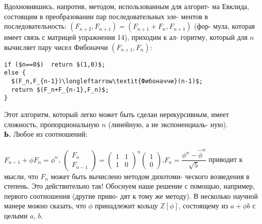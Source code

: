 Вдохновившись, напротив, методом, использованным для алгорит-\linebreak
ма Евклида, состоящим в преобразовании пар последовательных эле-\linebreak
ментов в последовательность: $(F_{n+2},F_{n+1})=(F_{n+1}+F_n,F_{n+1})$ (фор-\linebreak
мула, которая имеет связь с матрицей упражнения 14), приходим к ал-\linebreak
горитму, который для $n$ вычисляет пару чисел Фибоначчи $(F_{n+1},F_n)$:
\begin{lstlisting}[xleftmargin=15pt, mathescape=true]
if ($n==0$)  return $(1,0)$;
else {
  $(F_n,F_{n-1})\longleftarrow\textit{Фибоначчи}(n-1)$;
  return $(F_n+F_{n-1},F_n)$;
}
\end{lstlisting}
\hspace*{15pt}Этот алгоритм, который легко может быть сделан нерекурсивным,\linebreak
имеет сложность, пропорциональную $n$ (линейную, а не экспоненциаль-\linebreak
ную).\\
\hspace*{15pt}\textbf{Ь.} Любое из соотношений:\\\\
\hspace*{5pt}$F_{n-1}+\phi F_n=\phi^n$,\hspace{40pt}
$\begin{pmatrix}
F_n \\ F_{n-1}
\end{pmatrix}=
\begin{pmatrix}
1 & 1 \\ 1 & 0
\end{pmatrix}^n
\begin{pmatrix}
1 \\ 0
\end{pmatrix}$,\hspace{40pt}$F_n=\dfrac{\phi^n-\hat{\phi}^n}{\sqrt{5}}$\newline
приводит к мысли, что $F_n$ может быть вычислено методом дихотоми-\linebreak
ческого возведения в степень. Это действительно так! Обоснуем наше\linebreak
решение с помощью, например, первого соотношения (другие приво-\linebreak
дят к тому же методу). В несколько научной манере можно сказать,\linebreak
что $\phi$ принадлежит кольцу $\mathbb{Z}[\phi]$, состоящему из $a+\phi b$ с целыми $a$, $b$.\linebreak
